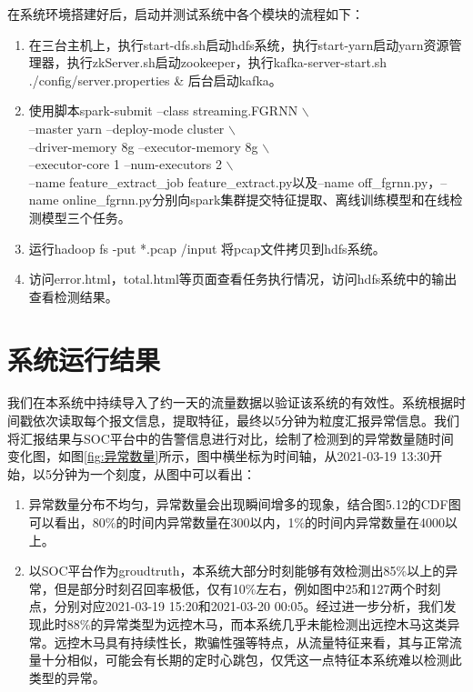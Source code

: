 在系统环境搭建好后，启动并测试系统中各个模块的流程如下：
\begin{enumerate}
  \item 在三台主机上，执行start-dfs.sh启动hdfs系统，执行start-yarn启动yarn资源管理器，执行zkServer.sh启动zookeeper，执行kafka-server-start.sh ./config/server.properties \& 后台启动kafka。
  \item 使用脚本spark-submit --class streaming.FGRNN $\backslash$ \\
  --master yarn --deploy-mode cluster $\backslash$ \\
  --driver-memory 8g --executor-memory 8g $\backslash$ \\
  --executor-core 1 --num-executors 2 $\backslash$ \\
 --name feature\_extract\_job feature\_extract.py以及--name off\_fgrnn.py，--name online\_fgrnn.py分别向spark集群提交特征提取、离线训练模型和在线检测模型三个任务。
 \item 运行hadoop fs -put *.pcap /input 将pcap文件拷贝到hdfs系统。
 \item 访问error.html，total.html等页面查看任务执行情况，访问hdfs系统中的输出查看检测结果。
\end{enumerate}
\section{系统运行结果}
我们在本系统中持续导入了约一天的流量数据以验证该系统的有效性。系统根据时间戳依次读取每个报文信息，提取特征，最终以5分钟为粒度汇报异常信息。我们将汇报结果与SOC平台中的告警信息进行对比，绘制了检测到的异常数量随时间变化图，如图\ref{fig:异常数量}所示，图中横坐标为时间轴，从2021-03-19 13:30开始，以5分钟为一个刻度，从图中可以看出：
\begin{enumerate}
  \item 异常数量分布不均匀，异常数量会出现瞬间增多的现象，结合图5.12的CDF图可以看出，80\%的时间内异常数量在300以内，1\%的时间内异常数量在4000以上。
  \item 以SOC平台作为groudtruth，本系统大部分时刻能够有效检测出85\%以上的异常，但是部分时刻召回率极低，仅有10\%左右，例如图中25和127两个时刻点，分别对应2021-03-19 15:20和2021-03-20 00:05。经过进一步分析，我们发现此时88\%的异常类型为远控木马，而本系统几乎未能检测出远控木马这类异常。远控木马具有持续性长，欺骗性强等特点，从流量特征来看，其与正常流量十分相似，可能会有长期的定时心跳包，仅凭这一点特征本系统难以检测此类型的异常。
\end{enumerate}

